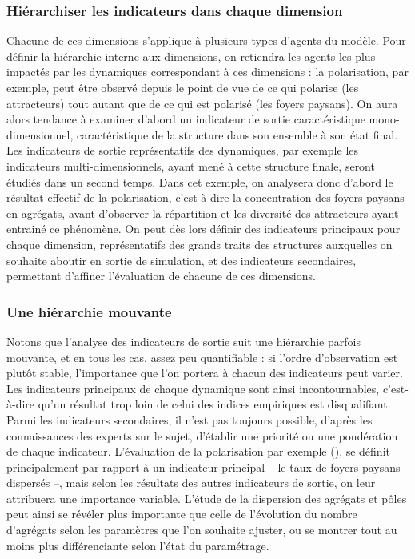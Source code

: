 \subsubsection{Hiérarchiser les indicateurs dans chaque dimension}\label{par:hierarchie_interne}
Chacune de ces dimensions s'applique à plusieurs types d'agents du modèle.
Pour définir la hiérarchie interne aux dimensions, on retiendra les agents les plus impactés par les dynamiques correspondant à ces dimensions :
la polarisation, par exemple, peut être observé depuis le point de vue de ce qui polarise (les attracteurs) tout autant que de ce qui est polarisé (les foyers paysans).
On aura alors tendance à examiner d'abord un indicateur de sortie caractéristique mono-dimensionnel, caractéristique de la structure dans son ensemble à son état final.
Les indicateurs de sortie représentatifs des dynamiques, par exemple les indicateurs multi-dimensionnels, ayant mené à cette structure finale, seront étudiés dans un second temps.
Dans cet exemple, on analysera donc d'abord le résultat effectif de la polarisation, c'est-à-dire la concentration des foyers paysans en agrégats, avant d'observer la répartition et les diversité des attracteurs ayant entrainé ce phénomène.
On peut dès lors définir des \og indicateurs principaux\fg{} pour chaque dimension, représentatifs des grands traits des structures auxquelles on souhaite aboutir en sortie de simulation, et des \og indicateurs secondaires\fg{}, permettant d'affiner l'évaluation de chacune de ces dimensions.

\subsubsection{Une hiérarchie mouvante}
Notons que l'analyse des indicateurs de sortie suit une hiérarchie parfois mouvante, et en tous les cas, assez peu quantifiable :
si l'ordre d'observation est plutôt stable, l'importance que l'on portera à chacun des indicateurs peut varier.
Les indicateurs principaux de chaque dynamique sont ainsi \og incontournables\fg{}, c'est-à-dire qu'un résultat trop loin de celui des indices empiriques est disqualifiant.
Parmi les indicateurs secondaires, il n'est pas toujours possible, d'après les connaissances des experts sur le sujet, d'établir une priorité ou une pondération de chaque indicateur.
L'évaluation de la polarisation par exemple (), se définit principalement par rapport à un indicateur principal -- le taux de foyers paysans dispersés --, mais selon les résultats des autres indicateurs de sortie, on leur attribuera une importance variable.
L'étude de la dispersion des agrégats et pôles peut ainsi se révéler plus importante que celle de l'évolution du nombre d'agrégats selon les paramètres que l'on souhaite ajuster, ou se montrer tout au moins plus différenciante selon l'état du paramétrage.


